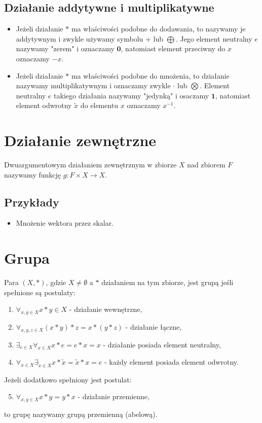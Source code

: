 \documentclass{article}
\begin{document}
\subsection{Działanie addytywne i multiplikatywne}
\begin{itemize}
    \item Jeżeli działanie $*$ ma właściwości podobne do dodawania, to nazywamy je addytywnym i zwykle używamy symbolu $+$ lub $\bigoplus$.
    Jego element neutralny $e$ nazywamy "zerem" i oznaczamy $\textbf{0}$, natomiast element przeciwny do $x$ oznaczamy $-x$.
    \item Jeżeli działanie $*$ ma właściwości podobne do mnożenia, to działanie nazywamy multiplikatywnym i oznaczamy zwykle $\cdot$ lub $\bigotimes$.
    Element neutralny $e$ takiego działania nazywamy "jedynką" i osaczamy $\textbf{1}$, natomiast element odwrotny $\tilde{x}$ do elementu $x$ oznaczamy $x^{-1}$.
\end{itemize}

\section{Działanie zewnętrzne}
Dwuargumentowym działaniem zewnętrznym w zbiorze $X$ nad zbiorem $F$ nazywamy funkcję $g : F \times X \rightarrow X$.

\subsection{Przykłady}
\begin{itemize}
    \item Mnożenie wektora przez skalar.
\end{itemize}

\section{Grupa}
Para $(X, *)$, gdzie $X \neq \emptyset$ a $*$ działaniem na tym zbiorze, jest grupą jeśli spełnione są postulaty:
\begin{enumerate}
    \item $\forall_{x,y \in X} x * y \in X$ - działanie wewnętrzne,
    \item $\forall_{x, y, z \in X} (x * y) * z = x * (y * z)$ - działanie łączne,
    \item $\exists_{e \in X} \forall_{x \in X} x * e = e * x = x$ - działanie posiada element neutralny,
    \item $\forall_{x \in X} \exists_{\tilde{x} \in X} x * \tilde{x} = \tilde{x} * x = e$ - każdy element posiada element odwrotny.
\end{enumerate}
Jeżeli dodatkowo spełniony jest postulat:
\begin{enumerate}
    \setcounter{enumi}{4}
    \item $\forall_{x,y \in X} x * y = y * x$ - działanie przemienne,
\end{enumerate}
to grupę nazywamy grupą przemienną (abelową).
\end{document}
